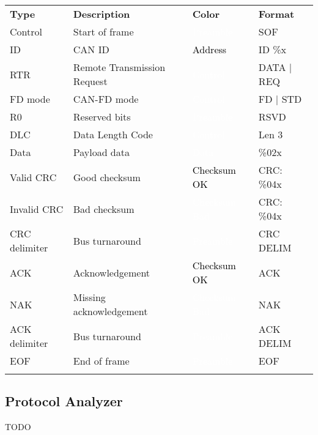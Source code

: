 \begin{tabularx}{16cm}{lllX}
\thickhline
\textbf{Type} & \textbf{Description} & \textbf{Color} & \textbf{Format} \\
\thickhline
Control & Start of frame & \cellcolor{preamble}\textcolor{white}{Preamble} & SOF \\
\thinhline
ID & CAN ID & \cellcolor{address}\textcolor{black}{Address} & ID \%x \\
\thinhline
RTR & Remote Transmission Request & \cellcolor{control}\textcolor{white}{Control} & DATA | REQ \\
\thinhline
FD mode & CAN-FD mode & \cellcolor{control}\textcolor{white}{Control} & FD | STD\\
\thinhline
R0 & Reserved bits & \cellcolor{preamble}\textcolor{white}{Preamble} & RSVD \\
\thinhline
DLC & Data Length Code & \cellcolor{control}\textcolor{white}{Control} & Len 3 \\
\thinhline
Data & Payload data & \cellcolor{data}\textcolor{white}{Data} & \%02x \\
\thinhline
Valid CRC & Good checksum & \cellcolor{checksumok}\textcolor{black}{Checksum OK} & CRC: \%04x \\
\thinhline
Invalid CRC & Bad checksum & \cellcolor{checksumbad}\textcolor{white}{Checksum Bad} & CRC: \%04x \\
\thinhline
CRC delimiter & Bus turnaround & \cellcolor{preamble}\textcolor{white}{Preamble} & CRC DELIM \\
\thinhline
ACK & Acknowledgement & \cellcolor{checksumok}\textcolor{black}{Checksum OK} & ACK \\
\thinhline
NAK & Missing acknowledgement & \cellcolor{checksumbad}\textcolor{white}{Checksum Bad} & NAK \\
\thinhline
ACK delimiter & Bus turnaround & \cellcolor{preamble}\textcolor{white}{Preamble} & ACK DELIM \\
\thinhline
EOF & End of frame & \cellcolor{preamble}\textcolor{white}{Preamble} & EOF \\

\thickhline
\end{tabularx}

\subsection{Protocol Analyzer}

TODO

\pagebreak
